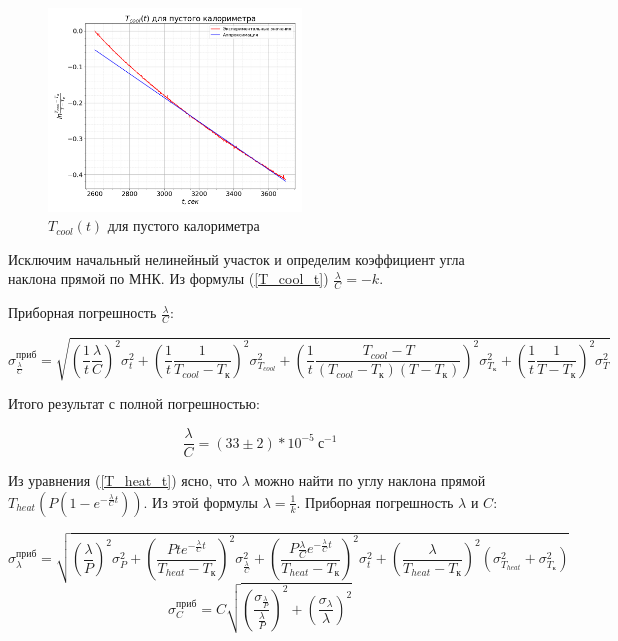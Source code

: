 \documentclass[a4paper, 12pt]{article}
\begin{document}
                \begin{figure}[ht]
                    \centering
                    \includegraphics[width=0.6\textwidth]{img/graph_cool_1.png}
                    \caption{$T_{cool}(t)$ для пустого калориметра}
                    \label{plot:T_cool_1}
                \end{figure}

                Исключим начальный нелинейный участок и определим коэффициент угла наклона прямой по МНК. Из формулы (\ref{T_cool_t}) $\frac{\lambda}{C} = -k$.

                Приборная погрешность $\frac{\lambda}{C}$:

                \begin{equation*}
                    \sigma_{\frac{\lambda}{C}}^{приб} = \sqrt{ \left( \frac{1}{t} \frac{\lambda}{C} \right)^2 \sigma_t^2 + \left( \frac{1}{t} \frac{1}{T_{cool} - T_к} \right)^2 \sigma_{T_{cool}}^2 + \left( \frac{1}{t} \frac{T_{cool} - T}{(T_{cool} - T_к)(T - T_к)} \right)^2 \sigma_{T_к}^2 + \left( \frac{1}{t} \frac{1}{T - T_к} \right)^2 \sigma_T^2}
                \end{equation*}

                Итого результат с полной погрешностью:

                \begin{equation*}
                    \frac{\lambda}{C} = (33 \pm 2)*10^{-5}~с^{-1}
                \end{equation*}

                Из уравнения (\ref{T_heat_t}) ясно, что $\lambda$ можно найти по углу наклона прямой $T_{heat}\left(P(1 - e^{- \frac{\lambda}{C} t})\right)$. Из этой формулы $\lambda = \frac{1}{k}$. Приборная погрешность $\lambda$ и $C$:

                \begin{equation*}
                    \sigma_{\lambda}^{приб} = \sqrt{\left( \frac{\lambda}{P} \right)^2 \sigma_P^2 + \left( \frac{P t e^{-\frac{\lambda}{C} t}}{T_{heat} - T_к} \right)^2 \sigma_{\frac{\lambda}{C}}^2 + \left( \frac{P \frac{\lambda}{C} e^{-\frac{\lambda}{C} t}}{T_{heat} - T_к} \right)^2 \sigma_t^2 + \left( \frac{\lambda}{T_{heat} - T_к} \right)^2 \left( \sigma_{T_{heat}}^2 + \sigma_{T_к}^2 \right)}
                \end{equation*}
                \begin{equation*}
                    \sigma_C^{приб} = C \sqrt{\left( \frac{ \sigma_{\frac{\lambda}{P}}}{\frac{\lambda}{P}} \right)^2 + \left( \frac{\sigma_{\lambda}}{\lambda} \right)^2}
                \end{equation*}
\end{document}

